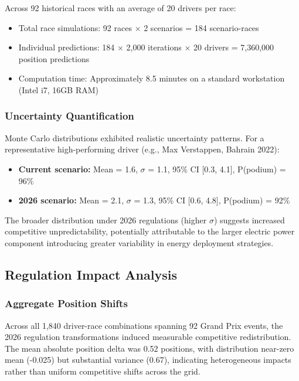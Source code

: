 \documentclass[conference]{IEEEtran}
\begin{document}
Across 92 historical races with an average of 20 drivers per race:
\begin{itemize}
    \item Total race simulations: 92 races $\times$ 2 scenarios = 184 scenario-races
    \item Individual predictions: 184 $\times$ 2,000 iterations $\times$ 20 drivers = 7,360,000 position predictions
    \item Computation time: Approximately 8.5 minutes on a standard workstation (Intel i7, 16GB RAM)
\end{itemize}

\subsubsection{Uncertainty Quantification}

Monte Carlo distributions exhibited realistic uncertainty patterns. For a representative high-performing driver (e.g., Max Verstappen, Bahrain 2022):

\begin{itemize}
    \item \textbf{Current scenario:} Mean = 1.6, $\sigma$ = 1.1, 95\% CI [0.3, 4.1], P(podium) = 96\%
    \item \textbf{2026 scenario:} Mean = 2.1, $\sigma$ = 1.3, 95\% CI [0.6, 4.8], P(podium) = 92\%
\end{itemize}

The broader distribution under 2026 regulations (higher $\sigma$) suggests increased competitive unpredictability, potentially attributable to the larger electric power component introducing greater variability in energy deployment strategies.

\subsection{Regulation Impact Analysis}

\subsubsection{Aggregate Position Shifts}

Across all 1,840 driver-race combinations spanning 92 Grand Prix events, the 2026 regulation transformations induced measurable competitive redistribution. The mean absolute position delta was 0.52 positions, with distribution near-zero mean (-0.025) but substantial variance (0.67), indicating heterogeneous impacts rather than uniform competitive shifts across the grid.
\end{document}
